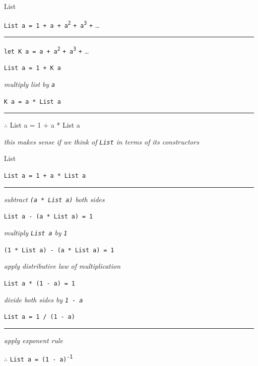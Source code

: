 \begin{frame}{List}

\lstinline{List a = 1 + a + a}\textsuperscript{\lstinline{2}} \lstinline{+ a}\textsuperscript{\lstinline{3}} \lstinline{+} \ldots

\par\noindent\rule{\textwidth}{0.4pt}

\lstinline{let K a = a + a}\textsuperscript{\lstinline{2}} \lstinline{+ a}\textsuperscript{\lstinline{3}} \lstinline{+} \ldots

\lstinline{List a = 1 + K a}

\emph{\tiny{multiply list by \lstinline{a}}}

\lstinline{K a = a * List a}

\par\noindent\rule{\textwidth}{0.4pt}

{$\therefore$} List a = 1 + a * List a

\emph{\tiny{this makes sense if we think of \lstinline{List} in terms of its constructors}}

\end{frame}


\begin{frame}{List}

\lstinline{List a = 1 + a * List a}

\par\noindent\rule{\textwidth}{0.4pt}

\emph{\tiny{subtract \lstinline{(a * List a)} both sides}}

\lstinline{List a - (a * List a) = 1}

\emph{\tiny{multiply \lstinline{List a} by \lstinline{1}}}

\lstinline{(1 * List a) - (a * List a) = 1}

\emph{\tiny{apply distributive law of multiplication}}

\lstinline{List a * (1 - a) = 1}

\emph{\tiny{divide both sides by \lstinline{1 - a}}}

\lstinline{List a = 1 / (1 - a)}

\par\noindent\rule{\textwidth}{0.4pt}

\emph{\tiny{apply exponent rule}}

{$\therefore$} \lstinline{List a = (1 - a)}\textsuperscript{\lstinline{-1}}

\end{frame}


